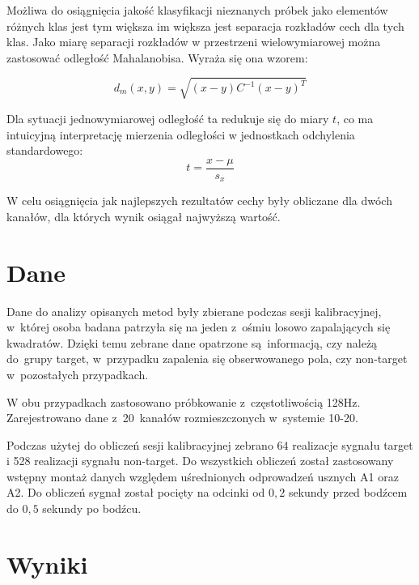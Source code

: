 \documentclass[licencjacka,openright]{pracamgr}
\begin{document}
Możliwa do osiągnięcia jakość klasyfikacji nieznanych próbek jako elementów różnych klas jest tym większa im większa jest separacja rozkładów cech dla tych klas. Jako miarę separacji rozkładów w przestrzeni wielowymiarowej można zastosować odległość Mahalanobisa. Wyraża się ona wzorem:

\begin{equation}
d_{m}{(x,y)}=\sqrt{(x-y)C^{-1}(x-y)^T}
\end{equation}

Dla sytuacji jednowymiarowej odległość ta redukuje się do miary $t$, co ma intuicyjną interpretację mierzenia odległości w jednostkach odchylenia standardowego:
\begin{equation}
t = \frac{x-\mu}{s_x}
\end{equation}

W celu osiągnięcia jak najlepszych rezultatów cechy były obliczane dla dwóch kanałów, dla których wynik osiągał najwyższą wartość.

\chapter{Dane}
Dane do analizy opisanych metod były zbierane podczas sesji kalibracyjnej, w~której osoba badana patrzyła się na jeden z~ośmiu losowo zapalających się kwadratów. Dzięki temu zebrane dane opatrzone są~informacją, czy należą do~grupy target, w~przypadku zapalenia się obserwowanego pola, czy non-target w~pozostałych przypadkach.

W obu przypadkach zastosowano próbkowanie z~częstotliwością 128Hz. Zarejestrowano dane z~20~kanałów rozmieszczonych w~systemie 10-20.

Podczas użytej do obliczeń sesji kalibracyjnej zebrano 64 realizacje sygnału target i 528 realizacji sygnału non-target. Do wszystkich obliczeń został zastosowany wstępny montaż danych względem uśrednionych odprowadzeń usznych A1 oraz A2. Do obliczeń sygnał został pocięty na odcinki od $0,2$ sekundy przed bodźcem do $0,5$  sekundy po bodźcu.





\chapter{Wyniki}
\label{wyniki}
\end{document}
